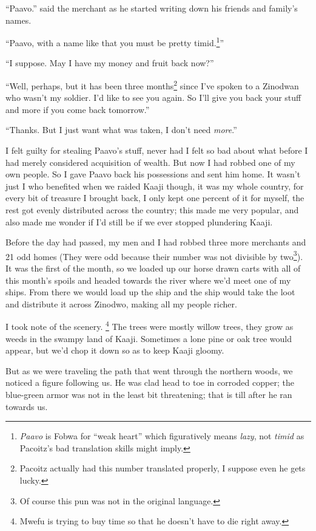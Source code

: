 ``Paavo.'' said the merchant as he started writing down his friends and family's names.

``Paavo, with a name like that you must be pretty timid.\footnote{\emph{Paavo} is Fo\-bwa for ``weak heart'' which figuratively means \emph{lazy}, not \emph{timid} as Pacoitz's bad translation skills might imply.}''

``I suppose. May I have my money and fruit back now?''

``Well, perhaps, but it has been three months\footnote{Pacoitz actually had this number translated properly, I suppose even he gets lucky.} since I've spoken to a Zinodwan who wasn't my soldier. I'd like to see you again. So I'll give you back your stuff and more if you come back tomorrow.''

``Thanks. But I just want what was taken, I don't need \emph{more}.''

I felt guilty for stealing Paavo's stuff, never had I felt so bad about what before I had merely considered acquisition of wealth. But now I had robbed one of my own people. So I gave Paavo back his possessions and sent him home. It wasn't just I who benefited when we raided Kaaji though, it was my whole country, for every bit of treasure I brought back, I only kept one percent of it for myself, the rest got evenly distributed across the country; this made me very popular, and also made me wonder if I'd still be if we ever stopped plundering Kaaji.

Before the day had passed, my men and I had robbed three more merchants and 21 odd homes (They were odd because their number was not divisible by two\footnote{Of course this pun was not in the original language.}).
It was the first of the month, so we loaded up our horse drawn carts with all of this month's spoils and headed towards the river where we'd meet one of my ships. From there we would load up the ship and the ship would take the loot and distribute it across Zinodwo, making all my people richer.

I took note of the scenery. \footnote{Mwefu is trying to buy time so that he doesn't have to die right away.}
The trees were mostly willow trees, they grow as weeds in the swampy land of Kaaji. Sometimes a lone pine or oak tree would appear, but we'd chop it down so as to keep Kaaji gloomy.

But as we were traveling the path that went through the northern woods, we noticed a figure following us. He was clad head to toe in corroded copper; the blue-green armor was not in the least bit threatening; that is till after he ran towards us.

